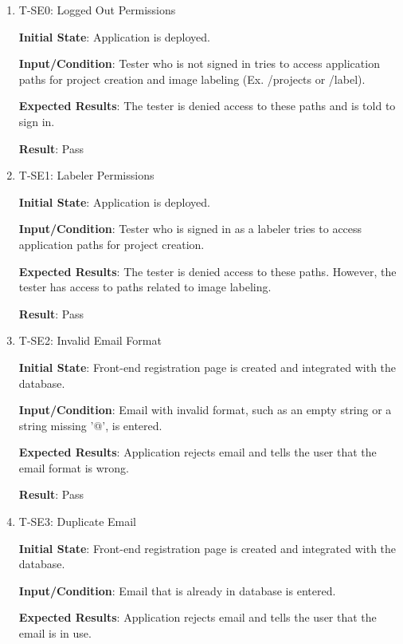 \documentclass[12pt, titlepage]{article}
\begin{document}
\begin{enumerate}

\item{T-SE0: Logged Out Permissions\\}
					
\textbf{Initial State}: Application is deployed.
					
\textbf{Input/Condition}: Tester who is not signed in tries to access application paths for project creation and image labeling (Ex. /projects or /label).
					
\textbf{Expected Results}: The tester is denied access to these paths and is told to sign in.
					
\textbf{Result}: Pass

\item{T-SE1: Labeler Permissions\\}

					
\textbf{Initial State}: Application is deployed.
					
\textbf{Input/Condition}: Tester who is signed in as a labeler tries to access application paths for project creation.
					
\textbf{Expected Results}: The tester is denied access to these paths. However, the tester has access to paths related to image labeling.
					
\textbf{Result}: Pass

\item{T-SE2: Invalid Email Format\\}

					
\textbf{Initial State}: Front-end registration page is created and integrated with the database.
					
\textbf{Input/Condition}: Email with invalid format, such as an empty string or a string missing '@', is entered.
					
\textbf{Expected Results}: Application rejects email and tells the user that the email format is wrong.
					
\textbf{Result}: Pass

\item{T-SE3: Duplicate Email\\}

					
\textbf{Initial State}: Front-end registration page is created and integrated with the database.
					
\textbf{Input/Condition}: Email that is already in database is entered.
					
\textbf{Expected Results}: Application rejects email and tells the user that the email is in use.
					

\end{enumerate}
\end{document}
